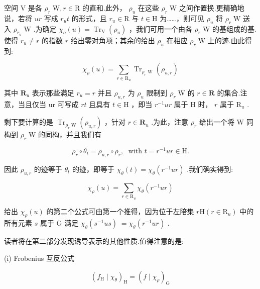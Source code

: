\documentclass[10pt]{article}
\begin{document}
空间 \(\mathrm{V}\) 是各 \({\rho }_{r}\mathrm{\;W},r \in  \mathrm{R}\) 的直和.此外， \({\rho }_{u}\) 在这些 \({\rho }_{r}\mathrm{\;W}\) 之间作置换.更精确地说，若将 \({ur}\) 写成 \({r}_{u}t\) 的形式，且 \({r}_{u} \in  \mathrm{R}\) 与 \(t \in  \mathrm{H}\) 为……，则可见 \({\rho }_{u}\) 将 \({\rho }_{r}\mathrm{\;W}\) 送入 \({\rho }_{{r}_{u}}\mathrm{\;W}\) .为确定 \({\chi }_{o}\left( u\right)  = {\operatorname{Tr}}_{\mathrm{V}}\left( {\rho }_{u}\right)\) ，我们可用一个由各 \({\rho }_{r}\mathrm{\;W}\) 的基组成的基.使得 \({r}_{u} \neq  r\) 的指数 \(r\) 给出零对角项；其余的给出 \({\rho }_{u}\) 在相应 \({\rho }_{r}\mathrm{\;W}\) 上的迹.由此得到:

\[
{\chi }_{\rho }\left( u\right)  = \mathop{\sum }\limits_{{r \in  {\mathrm{R}}_{u}}}{\operatorname{Tr}}_{{\rho }_{r}\mathrm{\;W}}\left( {\rho }_{u,r}\right)
\]

其中 \({\mathbf{R}}_{u}\) 表示那些满足 \({r}_{u} = r\) 并且 \({\rho }_{u,r}\) 为 \({\rho }_{u}\) 限制到 \({\rho }_{r}\mathrm{\;W}\) 的 \(r \in  \mathbf{R}\) 的集合.注意，当且仅当 ur 可写成 \({rt}\) 且具有 \(t \in  \mathrm{H}\) ，即当 \({r}^{-1}{ur}\) 属于 \(\mathrm{H}\) 时， \(r\) 属于 \({\mathrm{R}}_{u}\) .

剩下要计算的是 \({\operatorname{Tr}}_{{\rho }_{r}\mathrm{\;W}}\left( {\rho }_{u,r}\right)\) ，针对 \(r \in  {\mathbf{R}}_{u}\) .为此，注意 \({\rho }_{r}\) 给出一个将 \(\mathrm{W}\) 同构到 \({\rho }_{r}\mathrm{\;W}\) 的同构，并且我们有

\[
{\rho }_{r} \circ  {\theta }_{t} = {\rho }_{u,r} \circ  {\rho }_{r},\;\text{ with }t = {r}^{-1}{ur} \in  \mathrm{H}.
\]

因此 \({\rho }_{u,r}\) 的迹等于 \({\theta }_{t}\) 的迹，即等于 \({\chi }_{\theta }\left( t\right)  = {\chi }_{\theta }\left( {{r}^{-1}{ur}}\right)\) .我们确实得到:

\[
{\chi }_{\rho }\left( u\right)  = \mathop{\sum }\limits_{{r \in  {\mathrm{R}}_{u}}}{\chi }_{\theta }\left( {{r}^{-1}{ur}}\right)
\]

给出 \({\chi }_{\rho }\left( u\right)\) 的第二个公式可由第一个推得，因为位于左陪集 \(r\mathrm{H}\left( {r \in  {\mathrm{R}}_{u}}\right)\) 中的所有元素 \(s\) 属于 \(\mathrm{G}\) 满足 \({\chi }_{\theta }\left( {{s}^{-1}{us}}\right) \; = {\chi }_{\theta }\left( {{r}^{-1}{ur}}\right)\) .

读者将在第二部分发现诱导表示的其他性质.值得注意的是:

(i) Frobenius 互反公式

\[
{\left( {f}_{\mathrm{H}} \mid  {\chi }_{\theta }\right) }_{\mathrm{H}} = {\left( f \mid  {\chi }_{\rho }\right) }_{\mathrm{G}}
\]
\end{document}
